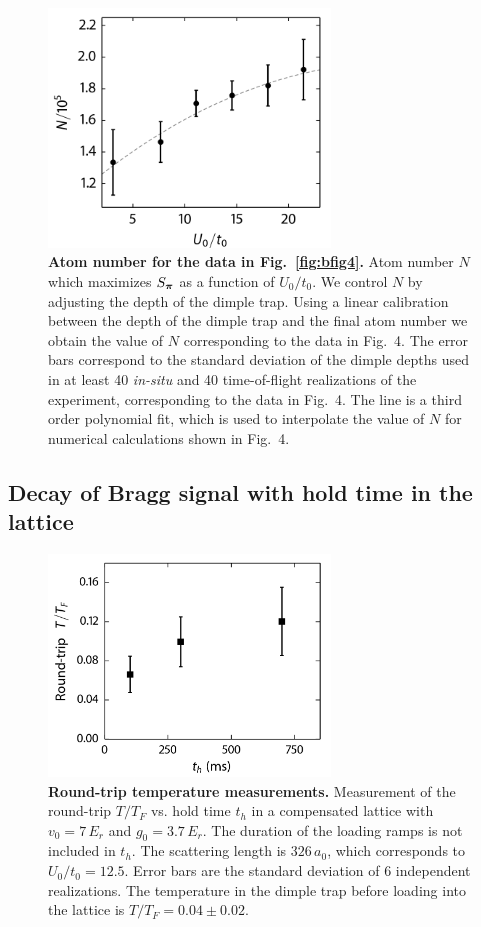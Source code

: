 \begin{figure}
\centering \includegraphics[width=75mm]{../figures/afmpaper/Hulet_EDfig2.png}
\caption{\textbf{Atom number for the data in Fig.~\ref{fig:bfig4}.}
Atom number $N$ which maximizes $S_{\bm{\pi}}$ as a function of $U_{0}/t_{0}$.
We control $N$ by adjusting the depth of the dimple trap.  Using a linear
calibration between the depth of the dimple trap and the final atom number  we
obtain the value of $N$ corresponding to the data in Fig.~4.  The error bars
correspond to the standard deviation of the dimple depths used in at least 40
\textit{in-situ} and 40 time-of-flight realizations of the experiment,
corresponding to the data in Fig.~4.   The line is a third order polynomial
fit, which is used to interpolate the value of $N$ for numerical calculations
shown in Fig.~4. }
\label{fig:number-EDfig2}
\end{figure}

\subsection{Decay of Bragg signal with hold time in the lattice}

\begin{figure}
\centering \includegraphics[width=75mm]{../figures/afmpaper/Hulet_EDfig3.png} 
\caption{\textbf{Round-trip temperature measurements.} Measurement of
the round-trip $T/T_{F}$ vs. hold time $t_{h}$ in a compensated lattice with
$v_{0}=7\,E_{r}$  and $g_{0}=3.7\,E_{r}$.  The duration of the loading ramps is
not included in $t_{h}$.  The scattering length is $326\,a_{0}$,  which
corresponds to $U_{0}/t_{0}=12.5$.  Error bars are the standard deviation of 6
independent realizations.  The temperature in the dimple trap before loading
into the lattice is $T/T_{F}=0.04\pm0.02$. }
\label{fig:roundtrip-heat}
\end{figure}



